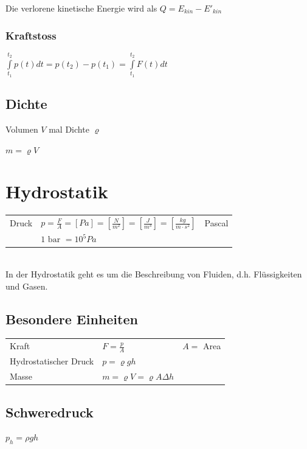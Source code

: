 \documentclass[a4paper]{scrartcl}
\begin{document}
	Die verlorene kinetische Energie wird als $Q = E_{kin}  - E'_{kin}$

\subsubsection{Kraftstoss}

	$\int\limits^{t_2}_{t_1} p(t) dt = p(t_2) - p(t_1) = \int\limits^{t_2}_{t_1} F(t) dt$


\subsection{Dichte}

	Volumen $V$ mal Dichte $\varrho$
	 
	$m = \varrho V$

\section{Hydrostatik}
	\begin{tabu} {l X l}
		\hline
		Druck
		&	$p = \frac{F}{A} = \left[ Pa \right] = \left[ \frac{N}{m^2} \right] = \left[ \frac{J}{m^3} \right] = \left[ \frac{kg}{m \cdot s^2} \right]$
		&	Pascal \\
		& $1 \text{ bar } = 10^5 Pa$
		\\ \hline
	\end{tabu}

	\hfill \\
	In der Hydrostatik geht es um die Beschreibung von Fluiden, d.h. Flüssigkeiten und Gasen.

\subsection{Besondere Einheiten} %
	\begin{tabu} {l X r}
		Kraft & $F = \frac{p}{A}$ & $A =$ Area\\
		Hydrostatischer Druck & $p = \varrho g h$ & \\
		Masse & $m = \varrho V = \varrho A \Delta h$
	\end{tabu}



\subsection{Schweredruck}


$p_h = \rho g h$
\end{document}
